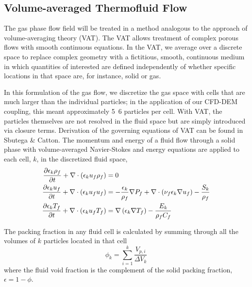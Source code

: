 \subsection{Volume-averaged Thermofluid Flow}

The gas phase flow field will be treated in a method analogous to the approach of volume-averaging theory (VAT).\cite{Sbutega2013,whitaker1999method,Tsuji1992} The VAT allows treatment of complex porous flows with smooth continuous equations. In the VAT, we average over a discrete space to replace complex geometry with a fictitious, smooth, continuous medium in which quantities of interested are defined independently of whether specific locations in that space are, for instance, solid or gas.

In this formulation of the gas flow, we discretize the gas space with cells that are much larger than the individual particles; in the application of our CFD-DEM coupling, this meant approximately 5~6 particles per cell. With VAT, the particles themselves are not resolved in the fluid space but are simply introduced via closure terms.\cite{Sbutega2013,Horvat2006} Derivation of the governing equations of VAT can be found in Sbutega \& Catton\cite{Sbutega2013}. The momentum and energy of a fluid flow through a solid phase with volume-averaged Navier-Stokes and energy equations are applied to each cell, $k$, in the discretized fluid space,
\begin{subequations}\label{eq:cfd-equations}
\begin{align}
\pder[\epsilon_k \rho_f]{t} + \nabla\cdot(\epsilon_k u_f \rho_f) &= 0\\
\pder[\epsilon_k u_f]{t} + \nabla\cdot(\epsilon_k u_f u_f) &= -\frac{\epsilon_k}{\rho_f}\nabla P_f + \nabla\cdot\left(\nu_f\epsilon_k\nabla u_f\right) - \frac{S_k}{\rho_f}\\
\pder[\epsilon_k T_f]{t} + \nabla\cdot(\epsilon_k u_f T_f) &= \nabla\left(\epsilon_k\nabla T_f\right)-\frac{E_k}{\rho_fC_f}
\end{align}
\end{subequations}

The packing fraction in any fluid cell is calculated by summing through all the volumes of $k$ particles located in that cell
\begin{equation}
	\phi_k = \sum_{i=1}^k \frac{V_{p,i}}{\Delta V_k}
\end{equation}
where the fluid void fraction is the complement of the solid packing fraction, $\epsilon = 1 - \phi$. 


